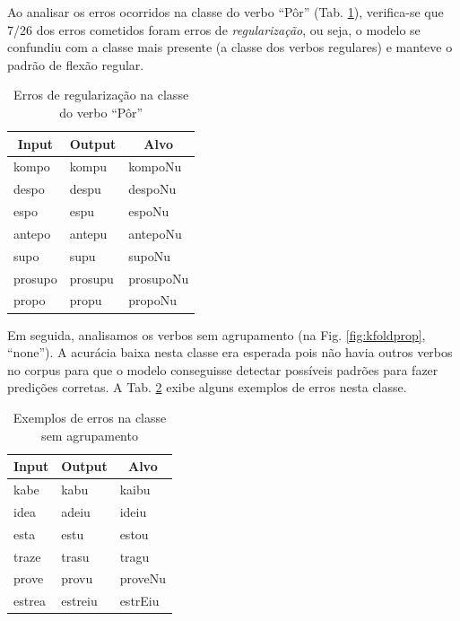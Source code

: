 Ao analisar os erros ocorridos na classe do verbo “Pôr” (Tab. \ref{tab:class_por}), verifica-se que 7/26 dos erros cometidos foram erros de \textit{regularização}, ou seja, o modelo se confundiu com a classe mais presente (a classe dos verbos regulares) e manteve o padrão de flexão regular.

\begin{table}[H]
\begin{tabular}{lll}
\multicolumn{1}{c}{Input} & \multicolumn{1}{c}{Output} & \multicolumn{1}{c}{Alvo} \\ \hline
kompo                     & kompu                      & kompoNu                  \\
despo                     & despu                      & despoNu                  \\
espo                      & espu                       & espoNu                   \\
antepo                    & antepu                     & antepoNu                 \\
supo                      & supu                       & supoNu                   \\
prosupo                   & prosupu                    & prosupoNu                \\
propo                     & propu                      & propoNu                  \\ \hline
\end{tabular}
\caption{Erros de regularização na classe do verbo “Pôr”}
\label{tab:class_por}
\end{table}

Em seguida, analisamos os verbos sem agrupamento (na Fig. \ref{fig:kfoldprop}, “none”). A acurácia baixa nesta classe era esperada pois não havia outros verbos no corpus para que o modelo conseguisse detectar possíveis padrões para fazer predições corretas. A Tab. \ref{tab:none} exibe alguns exemplos de erros nesta classe.

\begin{table}[H]
\begin{tabular}{lll}
\multicolumn{1}{c}{Input} & \multicolumn{1}{c}{Output} & \multicolumn{1}{c}{Alvo} \\ \hline
kabe                      & kabu                       & kaibu                    \\
idea                      & adeiu                      & ideiu                    \\
esta                      & estu                       & estou                    \\
traze                     & trasu                      & tragu                    \\
prove                     & provu                      & proveNu                  \\
estrea                    & estreiu                    & estrEiu                  \\ \hline
\end{tabular}
\caption{Exemplos de erros na classe sem agrupamento}
\label{tab:none}
\end{table}

